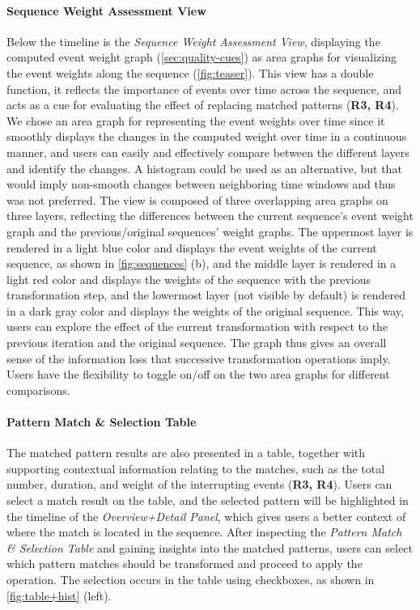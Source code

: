 \documentclass[camera]{vgtc}                          %
\begin{document}
\paragraph{Sequence Weight Assessment View}
Below the timeline is the \textit{Sequence Weight Assessment View}, displaying the computed event weight graph (\autoref{sec:quality-cues}) as area graphs for visualizing the event weights along the sequence (\autoref{fig:teaser}). This view has a double function, it reflects the importance of events over time across the sequence, and acts as a cue for evaluating the effect of replacing matched patterns (\textbf{R3, R4}). We chose an area graph for representing the event weights over time since it smoothly displays the changes in the computed weight over time in a continuous manner, and users can easily and effectively compare between the different layers and identify the changes. 
A histogram could be used as an alternative, but that would imply non-smooth changes between neighboring time windows and thus was not preferred.
The view is composed of three overlapping area graphs on three layers, reflecting the differences between the current sequence's event weight graph and the previous/original sequences' weight graphs.
The uppermost layer is rendered in a light blue color and displays the event weights of the current sequence, as shown in \autoref{fig:sequences} (b), and the middle layer is rendered in a light red color and displays the weights of the sequence with the previous transformation step, and the lowermost layer (not visible by default) is rendered in a dark gray color and displays the weights of the original sequence. This way, users can explore the effect of the current transformation with respect to the previous iteration and the original sequence. The graph thus gives an overall sense of the information loss that successive transformation operations imply.
Users have the flexibility to toggle on/off on the two area graphs for different comparisons. 

\paragraph{Pattern Match \& Selection Table}
The matched pattern results are also presented in a table, together with supporting contextual information relating to the matches, such as the total number, duration, and weight of the interrupting events (\textbf{R3, R4}). 
Users can select a match result on the table, and the selected pattern will be highlighted in the timeline of the \textit{Overview+Detail Panel}, which gives users a better context of where the match is located in the sequence.
After inspecting the \textit{Pattern Match \& Selection Table} and gaining insights into the matched patterns, users can select which pattern matches should be transformed and proceed to apply the operation. The selection occurs in the table using checkboxes, as shown in \autoref{fig:table+hist} (left).
\end{document}
